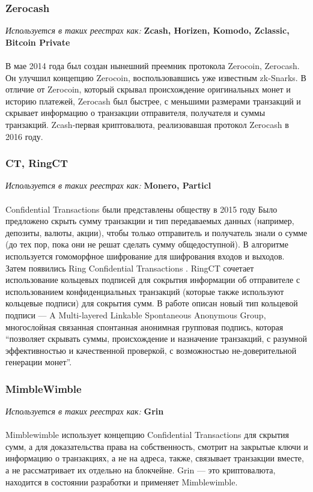 \subsubsection{Zerocash}
\emph{Используется в таких реестрах как: } \textbf{ Zcash, Horizen, Komodo, Zclassic, Bitcoin Private } \\\\
В мае 2014 года был создан нынешний преемник протокола Zerocoin, Zerocash. Он
улучшил концепцию Zerocoin, воспользовавшись уже известным zk-Snarks. В отличие
от Zerocoin, который скрывал происхождение оригинальных монет и историю
платежей, Zerocash был быстрее, с меньшими размерами транзакций и скрывает
информацию о транзакции отправителя, получателя и суммы транзакций.
Zcash-первая криптовалюта, реализовавшая протокол Zerocash в 2016 году.
\cite{ZerocoinElectricCoinCompany2016}

\subsubsection{CT, RingCT}\label{ringct}
\emph{Используется в таких реестрах как: } \textbf{Monero, Particl} \\\\
Confidential Transactions были представлены обществу в 2015 году \cite{Maxwell}
Было предложено скрыть сумму транзакции и тип передаваемых данных (например,
депозиты, валюты, акции), чтобы только отправитель и получатель знали о сумме
(до тех пор, пока они не решат сделать сумму общедоступной). В алгоритме
используется гомоморфное шифрование для шифрования входов и выходов.\\

Затем появились Ring Confidential Transactions \cite{Noether2016}.  RingCT
сочетает использование кольцевых подписей для сокрытия информации об
отправителе с использованием конфиденциальных транзакций (которые также
используют кольцевые подписи) для сокрытия сумм. В работе описан новый тип
кольцевой подписи --- A Multi-layered Linkable Spontaneous Anonymous Group,
многослойная связанная спонтанная анонимная групповая подпись, которая
``позволяет скрывать суммы, происхождение и назначение транзакций, с разумной
эффективностью и качественной проверкой, с возможностью не-доверительной
генерации монет''.

\subsubsection{MimbleWimble}
\emph{Используется в таких реестрах как: } \textbf{Grin} \\\\
Mimblewimble \cite{Poelstra2016} использует концепцию Confidential Transactions
для скрытия сумм, а для доказательства права на собственность, смотрит на
закрытые ключи и информацию о транзакциях, а не на адреса, также, связывает
транзакции вместе, а не рассматривает их отдельно на блокчейне. Grin --- это
криптовалюта, находится в состоянии разработки и применяет Mimblewimble.

